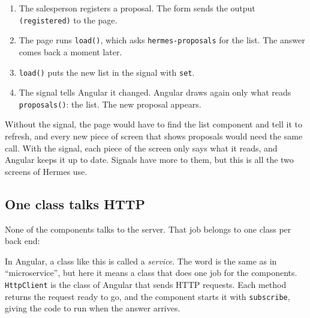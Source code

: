 \begin{enumerate}
  \item The salesperson registers a proposal. The form sends the output
        \texttt{(registered)} to the page.
  \item The page runs \texttt{load()}, which asks \texttt{hermes-proposals}
        for the list. The answer comes back a moment later.
  \item \texttt{load()} puts the new list in the signal with
        \texttt{set}.
  \item The signal tells Angular it changed. Angular draws again only what
        reads \texttt{proposals()}: the list. The new proposal appears.
\end{enumerate}

Without the signal, the page would have to find the list component and tell
it to refresh, and every new piece of screen that shows proposals would need
the same call. With the signal, each piece of the screen only says what it
reads, and Angular keeps it up to date. Signals have more to them, but this
is all the two screens of Hermes use.

\subsection*{One class talks HTTP}

None of the components talks to the server. That job belongs to one class
per back end:


In Angular, a class like this is called a \emph{service}. The word is the
same as in ``microservice'', but here it means a class that does one job for
the components. \texttt{HttpClient} is the class of Angular that sends HTTP
requests. Each method returns the request ready to go, and the component
starts it with \texttt{subscribe}, giving the code to run when the answer
arrives.

